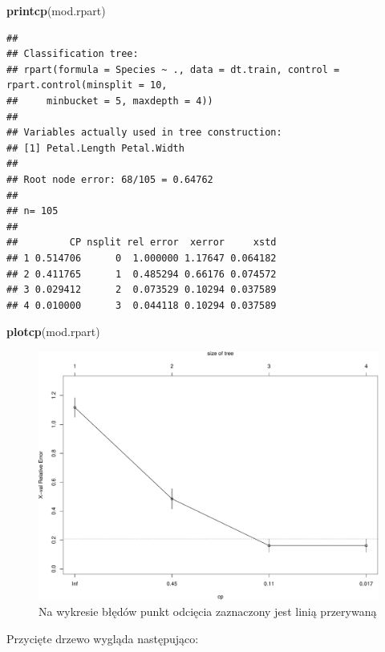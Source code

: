 \documentclass[]{book}
\newenvironment{Shaded}{\begin{snugshade}}{\end{snugshade}}
\newcommand{\KeywordTok}[1]{\textcolor[rgb]{0.13,0.29,0.53}{\textbf{#1}}}
\newcommand{\NormalTok}[1]{#1}
\theoremstyle{plain}
\theoremstyle{definition}
\theoremstyle{definition}
\theoremstyle{definition}
\theoremstyle{definition}
\theoremstyle{remark}
\begin{document}
\begin{Shaded}
\begin{Highlighting}[]
\KeywordTok{printcp}\NormalTok{(mod.rpart)}
\end{Highlighting}
\end{Shaded}

\begin{verbatim}
## 
## Classification tree:
## rpart(formula = Species ~ ., data = dt.train, control = rpart.control(minsplit = 10, 
##     minbucket = 5, maxdepth = 4))
## 
## Variables actually used in tree construction:
## [1] Petal.Length Petal.Width 
## 
## Root node error: 68/105 = 0.64762
## 
## n= 105 
## 
##         CP nsplit rel error  xerror     xstd
## 1 0.514706      0  1.000000 1.17647 0.064182
## 2 0.411765      1  0.485294 0.66176 0.074572
## 3 0.029412      2  0.073529 0.10294 0.037589
## 4 0.010000      3  0.044118 0.10294 0.037589
\end{verbatim}

\begin{Shaded}
\begin{Highlighting}[]
\KeywordTok{plotcp}\NormalTok{(mod.rpart)}
\end{Highlighting}
\end{Shaded}

\begin{figure}
\centering
\includegraphics{EksploracjaDanych_files/figure-latex/unnamed-chunk-17-1.pdf}
\caption{\label{fig:unnamed-chunk-17}Na wykresie błędów punkt odcięcia zaznaczony jest linią przerywaną}
\end{figure}

Przycięte drzewo wygląda następująco:
\end{document}
